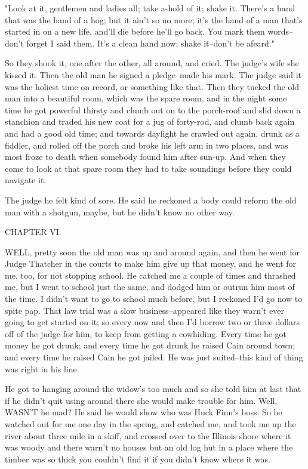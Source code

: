 "Look at it, gentlemen and ladies all; take a-hold of it; shake it.
There's a hand that was the hand of a hog; but it ain't so no more; it's
the hand of a man that's started in on a new life, and'll die before
he'll go back.  You mark them words--don't forget I said them.  It's a
clean hand now; shake it--don't be afeard."

So they shook it, one after the other, all around, and cried.  The
judge's wife she kissed it.  Then the old man he signed a pledge--made
his mark. The judge said it was the holiest time on record, or something
like that. Then they tucked the old man into a beautiful room, which was
the spare room, and in the night some time he got powerful thirsty and
clumb out on to the porch-roof and slid down a stanchion and traded his
new coat for a jug of forty-rod, and clumb back again and had a good old
time; and towards daylight he crawled out again, drunk as a fiddler, and
rolled off the porch and broke his left arm in two places, and was most
froze to death when somebody found him after sun-up.  And when they come
to look at that spare room they had to take soundings before they could
navigate it.

The judge he felt kind of sore.  He said he reckoned a body could reform
the old man with a shotgun, maybe, but he didn't know no other way.




CHAPTER VI.

WELL, pretty soon the old man was up and around again, and then he went
for Judge Thatcher in the courts to make him give up that money, and he
went for me, too, for not stopping school.  He catched me a couple of
times and thrashed me, but I went to school just the same, and dodged him
or outrun him most of the time.  I didn't want to go to school much
before, but I reckoned I'd go now to spite pap.  That law trial was a
slow business--appeared like they warn't ever going to get started on
it; so every now and then I'd borrow two or three dollars off of the
judge for him, to keep from getting a cowhiding.  Every time he got money
he got drunk; and every time he got drunk he raised Cain around town; and
every time he raised Cain he got jailed.  He was just suited--this kind
of thing was right in his line.

He got to hanging around the widow's too much and so she told him at last
that if he didn't quit using around there she would make trouble for him.
Well, WASN'T he mad?  He said he would show who was Huck Finn's boss.  So
he watched out for me one day in the spring, and catched me, and took me
up the river about three mile in a skiff, and crossed over to the
Illinois shore where it was woody and there warn't no houses but an old
log hut in a place where the timber was so thick you couldn't find it if
you didn't know where it was.

